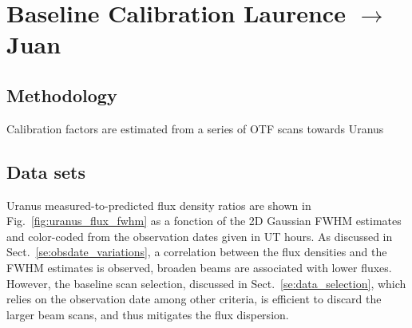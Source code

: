 \section{Baseline Calibration {\color{blue} Laurence $\rightarrow $ Juan} }

\subsection{Methodology}
Calibration factors are estimated from a series of OTF scans towards Uranus

\subsection{Data sets}


Uranus measured-to-predicted flux density ratios are shown in Fig.~\ref{fig:uranus_flux_fwhm} as a fonction of the 2D Gaussian FWHM estimates and color-coded from the observation dates given in UT hours. As discussed in Sect.~\ref{se:obsdate_variations}, a correlation between the flux densities and the FWHM estimates is observed, broaden beams are associated with lower fluxes. However, the baseline scan selection, discussed in Sect.~\ref{se:data_selection}, which relies on the observation date among other criteria, is efficient to discard the larger beam scans, and thus mitigates the flux dispersion.          


